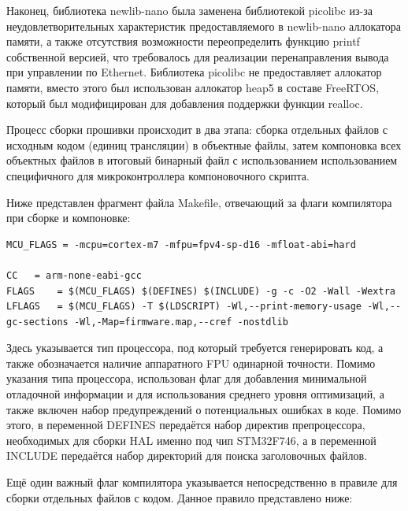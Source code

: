 \documentclass[rusmathsym, eqnumwithinsec, amspack, hyperref]{bomgost}
\begin{document}
Наконец, библиотека newlib-nano была заменена библиотекой picolibc из-за неудовлетворительных характеристик предоставляемого в newlib-nano аллокатора памяти, а также отсутствия возможности переопределить функцию printf собственной версией, что требовалось для реализации перенаправления вывода при управлении по Ethernet. Библиотека picolibc не предоставляет аллокатор памяти, вместо этого был использован аллокатор heap5 в составе FreeRTOS, который был модифицирован для добавления поддержки функции realloc.

Процесс сборки прошивки происходит в два этапа: сборка отдельных файлов с исходным кодом (единиц трансляции) в объектные файлы, затем компоновка всех объектных файлов в итоговый бинарный файл с использованием использованием специфичного для микроконтроллера компоновочного скрипта.

Ниже представлен фрагмент файла Makefile, отвечающий за флаги компилятора при сборке и компоновке:

\lstset{
	language=c,
	basicstyle=\scriptsize\ttfamily,
	numbers=left,
	stepnumber=1,
	showstringspaces=false,
	tabsize=4,
	breaklines=true,
	breakatwhitespace=false,
	xleftmargin=.1\textwidth, xrightmargin=.1\textwidth,
	belowskip=1em, aboveskip=1em
}
\begin{lstlisting}
MCU_FLAGS = -mcpu=cortex-m7 -mfpu=fpv4-sp-d16 -mfloat-abi=hard

CC	 = arm-none-eabi-gcc
FLAGS	 = $(MCU_FLAGS) $(DEFINES) $(INCLUDE) -g -c -O2 -Wall -Wextra
LFLAGS	 = $(MCU_FLAGS) -T $(LDSCRIPT) -Wl,--print-memory-usage -Wl,--gc-sections -Wl,-Map=firmware.map,--cref -nostdlib
\end{lstlisting}

Здесь указывается тип процессора, под который требуется генерировать код, а также обозначается наличие аппаратного FPU одинарной точности. Помимо указания типа процессора, использован флаг {\footnotesize{}} для добавления минимальной отладочной информации и {\footnotesize{}} для использования среднего уровня оптимизаций, а также включен набор предупреждений {\footnotesize{}} о потенциальных ошибках в коде. Помимо этого, в переменной DEFINES передаётся набор директив препроцессора, необходимых для сборки HAL именно под чип STM32F746, а в переменной INCLUDE передаётся набор директорий для поиска заголовочных файлов.

Ещё один важный флаг компилятора указывается непосредственно в правиле для сборки отдельных файлов с кодом. Данное правило представлено ниже:
\end{document}

